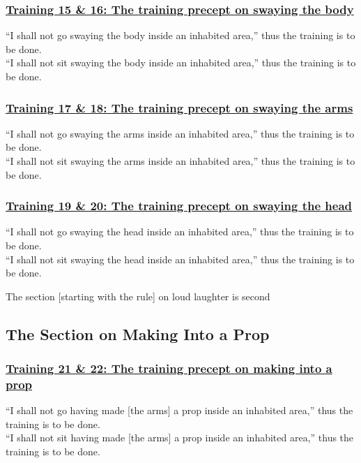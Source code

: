 \subsubsection*{\hyperref[sekh15-16]{Training 15 \& 16: The training precept on swaying the body}}
\label{training15-16}
``I shall not go swaying the body inside an inhabited area,'' thus the training is to be done.\\
``I shall not sit swaying the body inside an inhabited area,'' thus the training is to be done.



\subsubsection*{\hyperref[sekh17-18]{Training 17 \& 18: The training precept on swaying the arms}}
\label{training17-18}
``I shall not go swaying the arms inside an inhabited area,'' thus the training is to be done.\\
``I shall not sit swaying the arms inside an inhabited area,'' thus the training is to be done.



\subsubsection*{\hyperref[sekh19-20]{Training 19 \& 20: The training precept on swaying the head}}
\label{training19-20}
``I shall not go swaying the head inside an inhabited area,'' thus the training is to be done.\\
``I shall not sit swaying the head inside an inhabited area,'' thus the training is to be done.

\begin{center}
	The section [starting with the rule] on loud laughter is second
\end{center}



\setsubsecheadstyle{\subsectionFmt}
\subsection{The Section on Making Into a Prop}

\subsubsection*{\hyperref[sekh21-22]{Training 21 \& 22: The training precept on making into a prop}}
\label{training21-22}
``I shall not go having made [the arms] a prop inside an inhabited area,'' thus the training is to be done.\\
``I shall not sit having made [the arms] a prop inside an inhabited area,'' thus the training is to be done.



